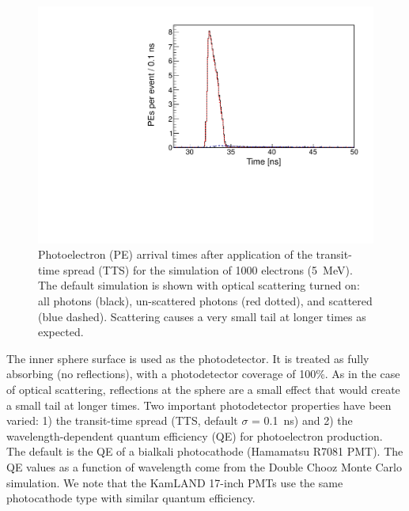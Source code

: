 \documentclass[cits]{JINST}
\begin{document}
\begin{figure}
        \begin{center}
        \includegraphics[scale=0.4]{graphs2/PEtime_Cerenkov_scattered_vs_unscattered.pdf}
        \caption[]{Photoelectron (PE) arrival times after application
        of the transit-time spread (TTS) for the simulation
        of 1000 electrons (5~MeV). The default simulation is shown with optical scattering turned on: all photons (black), un-scattered photons (red dotted), and scattered (blue dashed). Scattering causes a very small tail at longer times as expected. \label{scattplot}}
        \end{center}
\end{figure}

The inner sphere surface is used as the photodetector. It is treated
as fully absorbing (no reflections), with a photodetector coverage of
100\%. As in the case of optical scattering, reflections at the sphere are a small effect that would create a small tail at longer times. Two important photodetector properties have been varied: 1)
the transit-time spread (TTS, default $\sigma$ = 0.1~ns) and 2) the
wavelength-dependent quantum efficiency (QE) for photoelectron
production. The default is the QE of a bialkali photocathode (Hamamatsu
R7081 PMT)\cite{Hamamatsu_R7081}. The QE values as a function of wavelength come from the Double Chooz\cite{dctwo}
Monte Carlo simulation. We note that the KamLAND 17-inch PMTs use the
same photocathode type with similar quantum efficiency.
\end{document}

